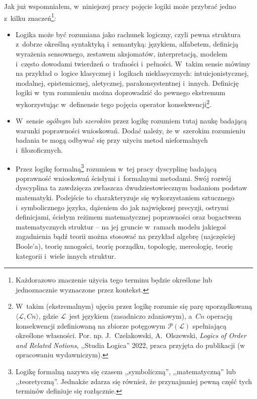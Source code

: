Jak już wspomniałem, w~niniejszej pracy pojęcie logiki może przybrać jedno z~kilku znaczeń\footnote{Każdorazowo znaczenie użycia tego terminu będzie określone lub jednoznacznie wyznaczone przez kontekst.}:
\begin{itemize}
\item Logika może być rozumiana jako rachunek logiczny, czyli pewna struktura z~dobrze określną syntaktyką i~semantyką: językiem, alfabetem, definicją wyrażenia sensownego, zestawem aksjomatów, interpretacją, modelem i~często dowodami twierdzeń o~trafności i~pełności. W~takim sensie mówimy na przykład o~logice klasycznej i~logikach nieklasycznych: intuicjonistycznej, modalnej, epistemicznej, aletycznej, parakonsystentnej i~innych. Definicję logiki w~tym rozumieniu można doprowadzić do pewnego ekstremum wykorzystując w~definensie tego pojęcia operator konsekwencji\footnote{W~takim (ekstremalnym) ujęciu przez logikę rozumie się parę uporządkowaną $\langle \mathcal{L}, Cn\rangle$, gdzie $\mathcal{L}$~jest językiem (zasadniczo zdaniowym), a~$Cn$ operacją konsekwencji zdefiniowaną na zbiorze potęgowym $\mathcal{P}(\mathcal{L})$ spełniającą określone własności. Por. np. J.~Czelakowski, A.~Olszewski, \textit{Logics of Order and Related} \textit{Notions}, ,,Studia Logica'' 2022, praca przyjęta do publikacji (w opracowaniu wydawniczym).}.
\item W~sensie \textit{ogólnym} lub \textit{szerokim} przez logikę rozumiem tutaj naukę badającą warunki poprawności wnioskowań. Dodać należy, że w~szerokim rozumieniu badania te mogą odbywać się przy użyciu metod nieformalnych i~filozoficznych.
\item Przez logikę formalną\footnote{Logikę formalną nazywa się czasem ,,symboliczną'', ,,matematyczną'' lub ,,teoretyczną''. Jednakże zdarza się również, że przynajmniej pewną część tych terminów definiuje się rozłącznie.} rozumiem w~tej pracy dyscyplinę badającą poprawność wnioskowań ścisłymi i~formalnymi metodami. Swój rozwój dyscyplina ta zawdzięcza zwłaszcza dwudziestowiecznym badaniom podstaw matematyki. Podejście to charakteryzuje się wykorzystaniem sztucznego i~symbolicznego języka, dążeniem do jak największej precyzji, ostrymi definicjami, ścisłym reżimem matematycznej poprawności oraz bogactwem matematycznych struktur -- na jej gruncie w~ramach modelu jakiegoś zagadnienia bądź teorii można stosować na przykład algebrę (najczęściej Boole'a), teorię mnogości, teorię porządku, topologię, mereologię, teorię kategorii i~wiele innych struktur.
\end{itemize}
